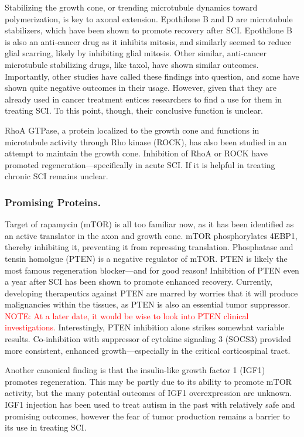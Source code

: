 \documentclass[12pt]{report}
\begin{document}
Stabilizing the growth cone, or trending microtubule dynamics toward polymerization, is key to axonal extension. Epothilone B and D are microtubule stabilizers, which have been shown to promote recovery after SCI. Epothilone B is also an anti-cancer drug as it inhibits mitosis, and similarly seemed to reduce glial scarring, likely by inhibiting glial mitosis. Other similar, anti-cancer microtubule stabilizing drugs, like taxol, have shown similar outcomes. Importantly, other studies have called these findings into question, and some have shown quite negative outcomes in their usage. However, given that they are already used in cancer treatment entices researchers to find a use for them in treating SCI. To this point, though, their conclusive function is unclear.\newline

RhoA GTPase, a protein localized to the growth cone and functions in microtubule activity through Rho kinase (ROCK), has also been studied in an attempt to maintain the growth cone. Inhibition of RhoA or ROCK have promoted regeneration---specifically in acute SCI. If it is helpful in treating chronic SCI remains unclear. 

\subsubsection{Promising Proteins.}

Target of rapamycin (mTOR) is all too familiar now, as it has been identified as an active translator in the axon and growth cone. mTOR phosphorylates 4EBP1, thereby inhibiting it, preventing it from repressing translation. Phosphatase and tensin homolgue (PTEN) is a negative regulator of mTOR. PTEN is likely the most famous regeneration blocker---and for good reason! Inhibition of PTEN even a year after SCI has been shown to promote enhanced recovery. Currently, developing therapeutics against PTEN are marred by worries that it will produce malignancies within the tissues, as PTEN is also an essential tumor suppressor. \textcolor{red}{NOTE: At a later date, it would be wise to look into PTEN clinical investigations.} Interestingly, PTEN inhibition alone strikes somewhat variable results. Co-inhibition with suppressor of cytokine signaling 3 (SOCS3) provided more consistent, enhanced growth---especially in the critical corticospinal tract.\newline 

Another canonical finding is that the insulin-like growth factor 1 (IGF1) promotes regeneration. This may be partly due to its ability to promote mTOR activity, but the many potential outcomes of IGF1 overexpression are unknown. IGF1 injection has been used to treat autism in the past with relatively safe and promising outcomes, however the fear of tumor production remains a barrier to its use in treating SCI.\newline
\end{document}
